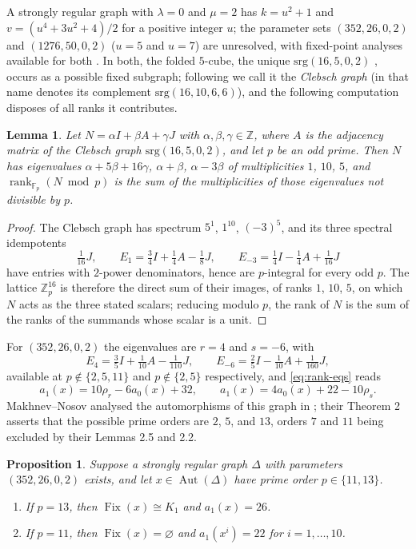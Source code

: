 \documentclass[11pt]{article}
\theoremstyle{plain}
\newtheorem{lemma}[theorem]{Lemma}
\newtheorem{proposition}[theorem]{Proposition}
\theoremstyle{remark}
\newcommand{\Aut}{\operatorname{Aut}}
\newcommand{\Fix}{\operatorname{Fix}}
\newcommand{\rank}{\operatorname{rank}}
\newcommand{\Zp}{\mathbb Z_p}
\newcommand{\Fp}{\mathbb F_p}
\begin{document}
A strongly regular graph with $\lambda=0$ and $\mu=2$ has $k=u^2+1$ and $v=(u^4+3u^2+4)/2$ for a positive integer $u$;
the parameter sets $(352,26,0,2)$ and $(1276,50,0,2)$ ($u=5$ and $u=7$) are unresolved,
with fixed-point analyses available for both \cite{MakhnevNosov2004,Nosov2016}.
In both, the folded $5$-cube, the unique $\mathrm{srg}(16,5,0,2)$ \cite{BrouwerVanMaldeghem}, occurs as a possible fixed subgraph;
following \cite{MakhnevNosov2004,Nosov2016} we call it the \emph{Clebsch graph}
(in \cite{BrouwerHaemers,BrouwerVanMaldeghem} that name denotes its complement $\mathrm{srg}(16,10,6,6)$),
and the following computation disposes of all ranks it contributes.

\begin{lemma}\label{lem:clebsch-rank}
Let $N=\alpha I+\beta A+\gamma J$ with $\alpha,\beta,\gamma\in\mathbb Z$,
where $A$ is the adjacency matrix of the Clebsch graph $\mathrm{srg}(16,5,0,2)$, and let $p$ be an odd prime.
Then $N$ has eigenvalues $\alpha+5\beta+16\gamma$, $\alpha+\beta$, $\alpha-3\beta$ of multiplicities $1$, $10$, $5$,
and $\rank_{\Fp}(N\bmod p)$ is the sum of the multiplicities of those eigenvalues not divisible by $p$.
\end{lemma}

\begin{proof}
The Clebsch graph has spectrum $5^1$, $1^{10}$, $(-3)^5$,
and its three spectral idempotents
\[
 \tfrac1{16}J,
 \qquad
 E_1=\tfrac34I+\tfrac14A-\tfrac18J,
 \qquad
 E_{-3}=\tfrac14I-\tfrac14A+\tfrac1{16}J
\]
have entries with $2$-power denominators, hence are $p$-integral for every odd $p$.
The lattice $\Zp^{16}$ is therefore the direct sum of their images, of ranks $1$, $10$, $5$,
on which $N$ acts as the three stated scalars;
reducing modulo $p$, the rank of $N$ is the sum of the ranks of the summands whose scalar is a unit.
\end{proof}

For $(352,26,0,2)$ the eigenvalues are $r=4$ and $s=-6$, with
\[
 E_{4}=\tfrac35I+\tfrac1{10}A-\tfrac1{110}J,
 \qquad
 E_{-6}=\tfrac25I-\tfrac1{10}A+\tfrac1{160}J,
\]
available at $p\notin\{2,5,11\}$ and $p\notin\{2,5\}$ respectively, and \eqref{eq:rank-eqs} reads
\[
 a_1(x)=10\rho_r-6a_0(x)+32,
 \qquad
 a_1(x)=4a_0(x)+22-10\rho_s.
\]
Makhnev--Nosov analysed the automorphisms of this graph in \cite[\S2]{MakhnevNosov2004};
their Theorem 2 asserts that the possible prime orders are $2$, $5$, and $13$,
orders $7$ and $11$ being excluded by their Lemmas 2.5 and 2.2.

\begin{proposition}\label{prop:352}
Suppose a strongly regular graph $\Delta$ with parameters $(352,26,0,2)$ exists, and let $x\in\Aut(\Delta)$ have prime order $p\in\{11,13\}$.
\begin{enumerate}
\item[(1)] If $p=13$, then $\Fix(x)\cong K_1$ and $a_1(x)=26$.
\item[(2)] If $p=11$, then $\Fix(x)=\varnothing$ and $a_1(x^i)=22$ for $i=1,\dots,10$.
\end{enumerate}
\end{proposition}
\end{document}
